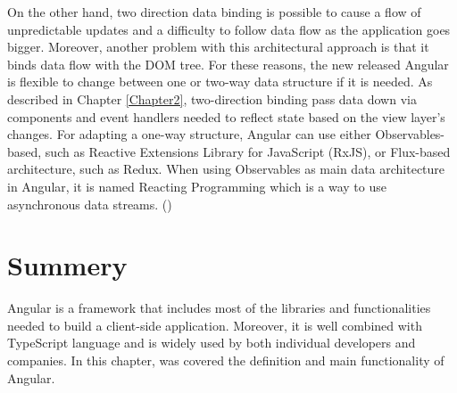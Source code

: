 On the other hand, two direction data binding is possible to cause a flow of unpredictable updates and a difficulty to follow data flow as the application goes bigger. Moreover, another problem with this architectural approach is that it binds data flow with the DOM tree. For these reasons, the new released Angular is flexible to change between one or two-way data structure if it is needed. As described in Chapter \ref{Chapter2}, two-direction binding pass data down via components and event handlers needed to reflect state based on the view layer's changes. For adapting a one-way structure, Angular can use either Observables-based, such as Reactive Extensions Library for JavaScript (RxJS), or Flux-based architecture, such as Redux. When using Observables as main data architecture in Angular, it is named Reacting Programming which is a way to use asynchronous data streams. (\cite{murray2018ng}) \par

\section{Summery}

Angular is a framework that includes most of the libraries and functionalities needed to build a client-side application. Moreover, it is well combined with TypeScript language and is widely used by both individual developers and companies. In this chapter, was covered the definition and main functionality of Angular. \par


